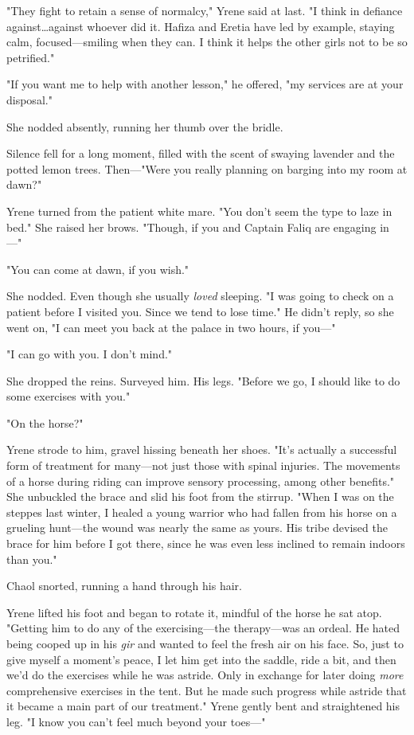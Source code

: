 "They fight to retain a sense of normalcy," Yrene said at last.
"I think in defiance against\ldots against whoever did it.
Hafiza and Eretia have led by example, staying calm, focused---smiling when they can.
I think it helps the other girls not to be so petrified."

"If you want me to help with another lesson," he offered, "my services are at your disposal."

She nodded absently, running her thumb over the bridle.

Silence fell for a long moment, filled with the scent of swaying lavender and the potted lemon trees.
Then---"Were you really planning on barging into my room at dawn?"

Yrene turned from the patient white mare.
"You don't seem the type to laze in bed."
She raised her brows.
"Though, if you and Captain Faliq are engaging in ---"

"You can come at dawn, if you wish."

She nodded.
Even though she usually \emph{loved} sleeping.
"I was going to check on a patient before I visited you.
Since we tend to 
lose time."
He didn't reply, so she went on, "I can meet you back at the palace in two hours, if you---"

"I can go with you.
I don't mind."

She dropped the reins.
Surveyed him.
His legs.
"Before we go, I should like to do some exercises with you."

"On the horse?"

Yrene strode to him, gravel hissing beneath her shoes.
"It's actually a successful form of treatment for many---not just those with spinal injuries.
The movements of a horse during riding can improve sensory processing, among other benefits."
She unbuckled the brace and slid his foot from the stirrup.
"When I was on the steppes last winter, I healed a young warrior who had fallen from his horse on a grueling hunt---the wound was nearly the same as yours.
His tribe devised the brace for him before I got there, since he was even less inclined to remain indoors than you."

Chaol snorted, running a hand through his hair.

Yrene lifted his foot and began to rotate it, mindful of the horse he sat atop.
"Getting him to do any of the exercising---the therapy---was an ordeal.
He hated being cooped up in his \emph{gir} and wanted to feel the fresh air on his face.
So, just to give myself a moment's peace, I let him get into the saddle, ride a bit, and then we'd do the exercises while he was astride.
Only in exchange for later doing \emph{more}
comprehensive exercises in the tent.
But he made such progress while astride that it became a main part of our treatment."
Yrene gently bent and straightened his leg.
"I know you can't feel much beyond your toes---"

